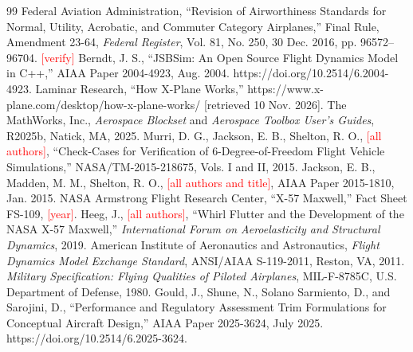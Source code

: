 \documentclass[conf]{new-aiaa}
\newcommand{\tbd}[1]{\textcolor{red}{[#1]}}
\begin{document}
\begin{thebibliography}{99}
 Federal Aviation Administration, ``Revision of Airworthiness Standards for
  Normal, Utility, Acrobatic, and Commuter Category Airplanes,'' Final Rule, Amendment 23-64,
  \emph{Federal Register}, Vol. 81, No. 250, 30 Dec. 2016, pp. 96572--96704. \tbd{verify}
 Berndt, J. S., ``JSBSim: An Open Source Flight Dynamics Model in
  C++,'' AIAA Paper 2004-4923, Aug. 2004. https://doi.org/10.2514/6.2004-4923.
 Laminar Research, ``How X-Plane Works,''
  https://www.x-plane.com/desktop/how-x-plane-works/ [retrieved 10 Nov. 2026].
 The MathWorks, Inc., \emph{Aerospace Blockset} and \emph{Aerospace
  Toolbox User's Guides}, R2025b, Natick, MA, 2025.
 Murri, D. G., Jackson, E. B., Shelton, R. O., \tbd{all authors},
  ``Check-Cases for Verification of 6-Degree-of-Freedom Flight Vehicle Simulations,''
  NASA/TM-2015-218675, Vols. I and II, 2015.
 Jackson, E. B., Madden, M. M., Shelton, R. O., \tbd{all authors and
  title}, AIAA Paper 2015-1810, Jan. 2015.
 NASA Armstrong Flight Research Center, ``X-57 Maxwell,'' Fact Sheet FS-109,
  \tbd{year}.
 Heeg, J., \tbd{all authors}, ``Whirl Flutter and the Development of the NASA
  X-57 Maxwell,'' \emph{International Forum on Aeroelasticity and Structural Dynamics}, 2019.
 American Institute of Aeronautics and Astronautics, \emph{Flight Dynamics Model
  Exchange Standard}, ANSI/AIAA S-119-2011, Reston, VA, 2011.
 \emph{Military Specification: Flying Qualities of Piloted Airplanes},
  MIL-F-8785C, U.S. Department of Defense, 1980.
 Gould, J., Shune, N., Solano Sarmiento, D., and Sarojini, D.,
  ``Performance and Regulatory Assessment Trim Formulations for Conceptual Aircraft Design,''
  AIAA Paper 2025-3624, July 2025. https://doi.org/10.2514/6.2025-3624.
\end{thebibliography}
\end{document}
